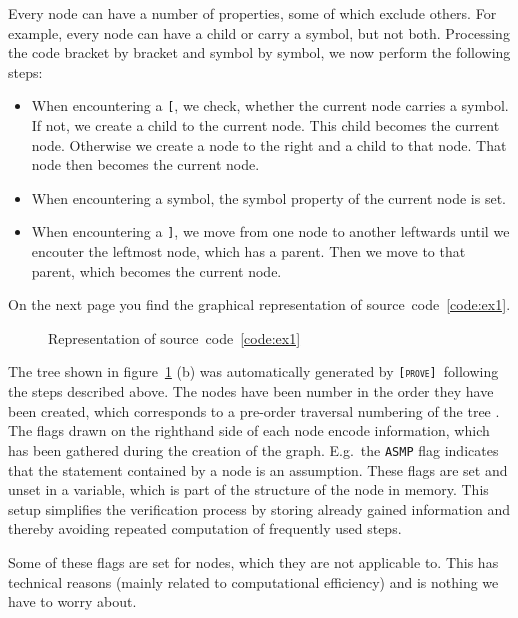 \documentclass[british]{article}
\newcommand\prv{bc}
\newcommand\m[1]{\texttt{#1}}
\newcommand\name{\texttt{\textsc{[prove]}}}
\begin{document}
Every node can have a number of properties, some of which exclude others. For
example, every node can have a child or carry a symbol, but not both. Processing
the code bracket by bracket and symbol by symbol, we now perform the following
steps:

\begin{itemize}
	\item
		When encountering a \m{[}, we check, whether the current node carries a
		symbol. If not, we create a child to the current node. This child
		becomes the current node. Otherwise we create a node to the right and a
		child to that node. That node then becomes the current node.
	\item
		When encountering a symbol, the symbol property of the current node is
		set.
	\item
		When encountering a \m{]}, we move from one node to another leftwards
		until we encouter the leftmost node, which has a parent. Then we move to
		that parent, which becomes the current node.
\end{itemize}

On the next page you find the graphical representation of
source~code~\ref{code:ex1}.
\pagebreak{}

\begin{figure}[!ht]
\caption{Representation of source~code~\ref{code:ex1}}\label{fig:ex1}
\centering
{}
\end{figure}

The tree shown in figure~\ref{fig:ex1} (b) was automatically generated by \name\
following the steps described above. The nodes have been number in the order
they have been created, which corresponds to a pre-order traversal numbering of
the tree \parencite{Tree}. The flags drawn on the righthand side of each node
encode information, which has been gathered during the creation of the graph.
E.g.\ the \texttt{ASMP} flag indicates that the statement contained by a node is
an assumption. These flags are set and unset in a variable, which is part of the
structure of the node in memory. This setup simplifies the verification process
by storing already gained information and thereby avoiding repeated computation
of frequently used steps.

Some of these flags are set for nodes, which they are not applicable to. This
has technical reasons (mainly related to computational efficiency) and is
nothing we have to worry about.
\end{document}
